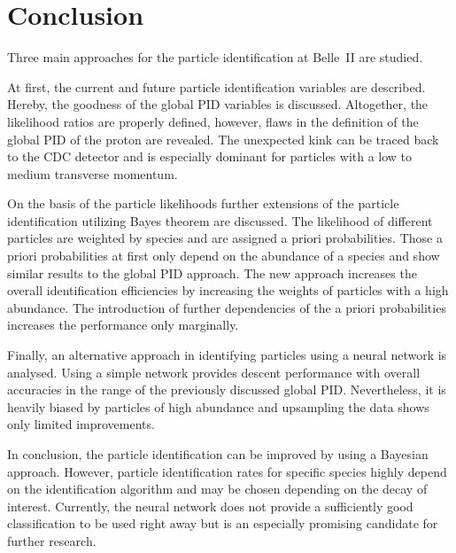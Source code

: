 \chapter{Conclusion}
\label{chap:conclusion}

Three main approaches for the particle identification at Belle~\RN{2} are studied.

At first, the current and future particle identification variables are described. Hereby, the goodness of the global PID variables is discussed. Altogether, the likelihood ratios are properly defined, however, flaws in the definition of the global PID of the proton are revealed. The unexpected kink can be traced back to the CDC detector and is especially dominant for particles with a low to medium transverse momentum.

On the basis of the particle likelihoods further extensions of the particle identification utilizing Bayes theorem are discussed. The likelihood of different particles are weighted by species and are assigned a priori probabilities. Those a priori probabilities at first only depend on the abundance of a species and show similar results to the global PID approach. The new approach increases the overall identification efficiencies by increasing the weights of particles with a high abundance. The introduction of further dependencies of the a priori probabilities increases the performance only marginally.

Finally, an alternative approach in identifying particles using a neural network is analysed. Using a simple network provides descent performance with overall accuracies in the range of the previously discussed global PID. Nevertheless, it is heavily biased by particles of high abundance and upsampling the data shows only limited improvements.

In conclusion, the particle identification can be improved by using a Bayesian approach. However, particle identification rates for specific species highly depend on the identification algorithm and may be chosen depending on the decay of interest. Currently, the neural network does not provide a sufficiently good classification to be used right away but is an especially promising candidate for further research.
